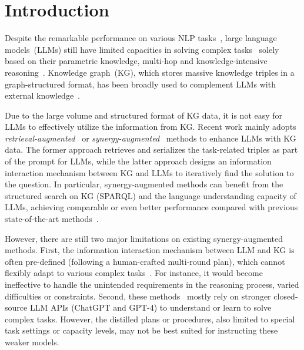 \section{Introduction}
\label{introduction}
Despite the remarkable performance on various NLP tasks~\cite{brown-NIPS-20,zhao-arxiv-23}, large language models~(LLMs) still have limited capacities in solving complex tasks~\cite{Hu-arxiv-2023-do} solely based on their parametric knowledge, \eg multi-hop and knowledge-intensive reasoning~\cite{Lan-KBQA_survey-2023}.
Knowledge graph~(KG), which stores massive knowledge triples in a graph-structured format, has been broadly used to complement LLMs with external knowledge~\cite{Pan-arxiv-unifying}.

Due to the large volume and structured format of KG data, it is not easy for LLMs to effectively utilize the information from KG. 
Recent work mainly adopts \textit{retrieval-augmented}~\cite{RNG-KBQA} or \textit{synergy-augmented}~\cite{Jiang-2023-arxiv-StructGPT} methods to enhance LLMs with KG data.
The former approach retrieves and serializes the task-related triples as part of the prompt for LLMs, while the latter approach designs an information interaction mechanism between KG and LLMs to iteratively find the solution to the question. 
In particular, synergy-augmented methods can benefit from the structured search on KG (\eg SPARQL) and the language understanding capacity of LLMs, achieving comparable or even better performance compared with previous state-of-the-art methods~\cite{Gu-ACL-23}. 

However, there are still two major limitations on existing synergy-augmented methods. 
First, the information interaction mechanism between LLM and KG is often pre-defined (\eg following a human-crafted multi-round plan), which cannot flexibly adapt to various complex tasks~\cite{Luo-arxiv-23-Reasoning, Jiang-2023-arxiv-StructGPT}. For instance, it would become ineffective to handle the unintended requirements in the reasoning process, \eg varied difficulties or constraints.  
Second, these methods~\cite{wang-arxiv-2023-a} mostly rely on stronger closed-source LLM APIs (\eg ChatGPT and GPT-4) to understand or learn to solve complex tasks. However, the distilled plans or procedures, also limited to special task settings or capacity levels,  may not be best suited for instructing these weaker models. 

